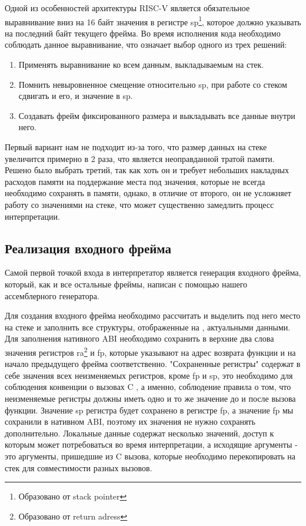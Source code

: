     Одной из особенностей архитектуры RISC-V является обязательное выравнивание вниз на 16 байт значения в регистре sp\footnote{Образовано от stack pointer}, которое должно указывать на последний байт текущего фрейма. Во время исполнения кода необходимо соблюдать данное выравнивание, что означает выбор одного из трех решений:
\begin{enumerate}
    \item Применять выравнивание ко всем данным, выкладываемым на стек.
    \item Помнить невыровненное смещение относительно sp, при работе со стеком сдвигать и его, и значение в sp.
    \item Создавать фрейм фиксированного размера и выкладывать все данные внутри него.
\end{enumerate}

Первый вариант нам не подходит из-за того, что размер данных на стеке увеличится примерно в 2 раза, что является неоправданной тратой памяти. Решено было выбрать третий, так как хоть он и требует небольших накладных расходов памяти на поддержание места под значения, которые не всегда необходимо сохранять в памяти, однако, в отличие от второго, он не усложняет работу со значениями на стеке, что может существенно замедлить процесс интерпретации.

\subsection{Реализация входного фрейма}

Самой первой точкой входа в интерпретатор является генерация входного фрейма, который, как и все остальные фреймы, написан с помощью нашего ассемблерного генератора. 

Для создания входного фрейма необходимо рассчитать и выделить под него место на стеке и заполнить все структуры, отображенные на , актуальными данными. Для заполнения нативного ABI необходимо сохранить в верхние два слова значения регистров ra\footnote{Образовано от return adress} и fp, которые указывают на адрес возврата функции и на начало предыдущего фрейма соответственно. "Сохраненные регистры" содержат в себе значения всех неизменяемых регистров, кроме fp и sp, это необходимо для соблюдения конвенции о вызовах C \cite{riscv:convention}, а именно, соблюдение правила о том, что неизменяемые регистры должны иметь одно и то же значение до и после вызова функции. Значение sp регистра будет сохранено в регистре fp, а значение fp мы сохранили в нативном ABI, поэтому их значения не нужно сохранять дополнительно. Локальные данные содержат несколько значений, доступ к которым может потребоваться во время интерпретации, а исходящие аргументы - это аргументы, пришедшие из C вызова, которые необходимо перекопировать на стек для совместимости разных вызовов.
 
